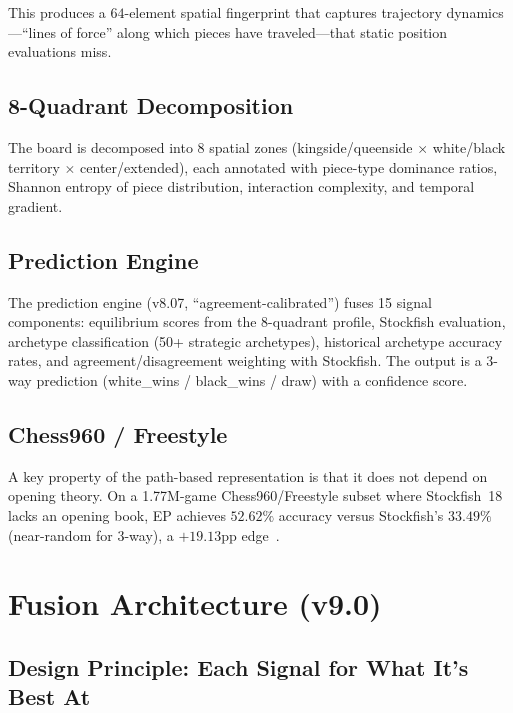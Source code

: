 \documentclass[11pt,a4paper]{article}
\begin{document}
This produces a $64$-element spatial fingerprint that captures trajectory
dynamics---``lines of force'' along which pieces have traveled---that
static position evaluations miss.

\subsection{8-Quadrant Decomposition}

The board is decomposed into 8 spatial zones (kingside/queenside $\times$
white/black territory $\times$ center/extended), each annotated with
piece-type dominance ratios, Shannon entropy of piece distribution,
interaction complexity, and temporal gradient.

\subsection{Prediction Engine}

The prediction engine (v8.07, ``agreement-calibrated'') fuses 15 signal
components: equilibrium scores from the 8-quadrant profile, Stockfish
evaluation, archetype classification (50+ strategic archetypes), historical
archetype accuracy rates, and agreement/disagreement weighting with
Stockfish. The output is a 3-way prediction (white\_wins / black\_wins /
draw) with a confidence score.

\subsection{Chess960 / Freestyle}

A key property of the path-based representation is that it does not depend
on opening theory. On a 1.77M-game Chess960/Freestyle subset where
Stockfish~18 lacks an opening book, EP achieves $52.62\%$ accuracy versus
Stockfish's $33.49\%$ (near-random for 3-way), a $+19.13$pp
edge~\cite{enpensent_results}.

\section{Fusion Architecture (v9.0)}
\label{sec:fusion}

\subsection{Design Principle: Each Signal for What It's Best At}
\end{document}
